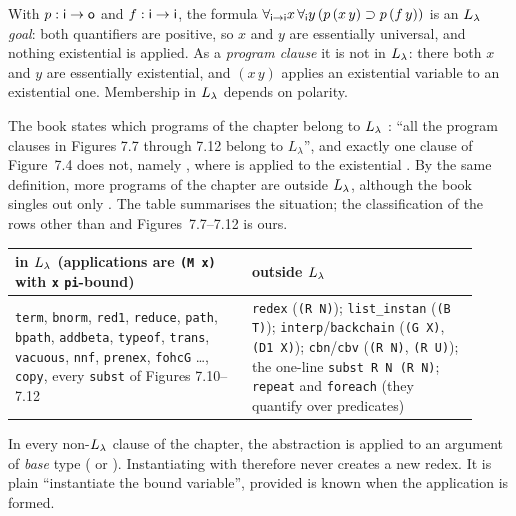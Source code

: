 {{{{{{\begin{example}
With $p:\mathsf{i}\to\mathsf{o}$ and $f:\mathsf{i}\to\mathsf{i}$, the formula
$\forall_{\mathsf{i}\to\mathsf{i}}x\,\forall_{\mathsf{i}}y\,(p\,(x\,y)\supset p\,(f\,y))$ is an $L_\lambda$ \emph{goal}: both
quantifiers are positive, so $x$ and $y$ are essentially universal, and nothing existential is applied. As a
\emph{program clause} it is not in $L_\lambda$: there both $x$ and $y$ are essentially existential, and $(x\,y)$ applies
an existential variable to an existential one. Membership in $L_\lambda$ depends on polarity.
\end{example}

The book states which programs of the chapter belong to $L_\lambda$ : \enquote{all the program clauses in
Figures 7.7 through 7.12 belong to $L_\lambda$}, and exactly one clause of Figure~7.4 does not, namely
, where  is applied to the existential . By the same definition, more
programs of the chapter are outside $L_\lambda$, although the book singles out only . The table summarises the
situation; the classification of the rows other than  and Figures~7.7--7.12 is ours.
\begin{center}
\begin{fullwidth}\centering
\small
\begin{tabular}{@{}>{\raggedright\arraybackslash}p{0.47\linewidth}>{\raggedright\arraybackslash}p{0.45\linewidth}@{}}
\toprule
in $L_\lambda$ (applications are \texttt{(M x)} with \texttt{x} \texttt{pi}-bound) & outside $L_\lambda$ \\
\midrule
\texttt{term}, \texttt{bnorm}, \texttt{red1}, \texttt{reduce}, \texttt{path}, \texttt{bpath}, \texttt{addbeta},
\texttt{typeof}, \texttt{trans}, \texttt{vacuous}, \texttt{nnf}, \texttt{prenex}, \texttt{fohcG} \ldots,
\texttt{copy}, every \texttt{subst} of Figures 7.10--7.12
& \texttt{redex} (\texttt{(R N)}); \texttt{list\_instan} (\texttt{(B T)}); \texttt{interp}/\texttt{backchain}
(\texttt{(G X)}, \texttt{(D1 X)}); \texttt{cbn}/\texttt{cbv} (\texttt{(R N)}, \texttt{(R U)}); the one-line
\texttt{subst R N (R N)}; \texttt{repeat} and \texttt{foreach} (they quantify over predicates) \\
\bottomrule
\end{tabular}
\end{fullwidth}
\end{center}
In every non-$L_\lambda$ clause of the chapter, the abstraction is applied to an argument of \emph{base} type
( or ). Instantiating  with  therefore never creates a new redex. It is
plain \enquote{instantiate the bound variable}, provided  is known when the application is formed.

}}}}}}
